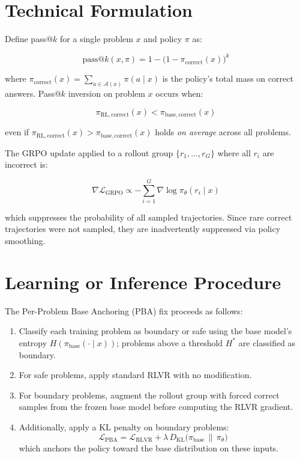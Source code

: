 \documentclass[10pt,twocolumn]{article}
\begin{document}
\section{Technical Formulation}

Define pass@$k$ for a single problem $x$ and policy $\pi$ as:

\[
\mathrm{pass@}k(x, \pi)
  = 1 - \bigl(1 - \pi_\mathrm{correct}(x)\bigr)^k
\]

where $\pi_\mathrm{correct}(x) = \sum_{a \in \mathcal{A}(x)} \pi(a \mid x)$
is the policy's total mass on correct answers. Pass@$k$ inversion on
problem $x$ occurs when:

\[
\pi_\mathrm{RL,correct}(x) < \pi_\mathrm{base,correct}(x)
\]

even if $\pi_\mathrm{RL,correct}(x) > \pi_\mathrm{base,correct}(x)$
holds \emph{on average} across all problems.

The GRPO update applied to a rollout group $\{r_1, \ldots, r_G\}$
where all $r_i$ are incorrect is:

\[
\nabla \mathcal{L}_\mathrm{GRPO}
  \propto -\sum_{i=1}^G \nabla \log \pi_\theta(r_i \mid x)
\]

which suppresses the probability of all sampled trajectories. Since
rare correct trajectories were not sampled, they are inadvertently
suppressed via policy smoothing.

\section{Learning or Inference Procedure}

The Per-Problem Base Anchoring (PBA) fix proceeds as follows:

\begin{enumerate}[itemsep=2pt,parsep=0pt]
  \item Classify each training problem as boundary or safe using the
    base model's entropy $H(\pi_\mathrm{base}(\cdot \mid x))$;
    problems above a threshold $H^*$ are classified as boundary.
  \item For safe problems, apply standard RLVR with no modification.
  \item For boundary problems, augment the rollout group with
    forced correct samples from the frozen base model before computing
    the RLVR gradient.
  \item Additionally, apply a KL penalty on boundary problems:
    \[
    \mathcal{L}_\mathrm{PBA} = \mathcal{L}_\mathrm{RLVR}
      + \lambda \, D_\mathrm{KL}\!\bigl(\pi_\mathrm{base} \,\|\, \pi_\theta\bigr)
    \]
    which anchors the policy toward the base distribution on these inputs.
\end{enumerate}
\end{document}
